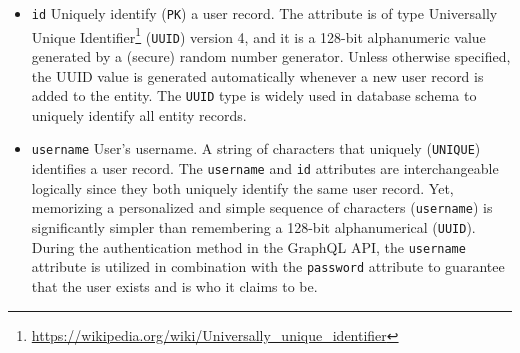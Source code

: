 \begin{itemize}
  \item \texttt{id}
    \newline
    Uniquely identify (\texttt{PK}) a user record.
    \newline
    The attribute is of type Universally Unique Identifier\footnote{\url{https://wikipedia.org/wiki/Universally_unique_identifier}}
    (\texttt{UUID}) version 4, and it is a 128-bit alphanumeric value generated
    by a (secure) random number generator. Unless otherwise specified, the UUID
    value is generated automatically whenever a new user record is added to the
    entity.
    \newline
    The \texttt{UUID} type is widely used in database schema to uniquely
    identify all entity records.

  \item \texttt{username}
    \newline
    User's username.
    \newline
    A string of characters that uniquely (\texttt{UNIQUE}) identifies a user
    record.
    \newline
    The \texttt{username} and \texttt{id} attributes are interchangeable logically
    since they both uniquely identify the same user record. Yet, memorizing a personalized
    and simple sequence of characters (\texttt{username}) is significantly
    simpler than remembering a 128-bit alphanumerical (\texttt{UUID}).
    \newline
    During the authentication method in the GraphQL API, the \texttt{username}
    attribute is utilized in combination with the \texttt{password} attribute to
    guarantee that the user exists and is who it claims to be.


\end{itemize}
